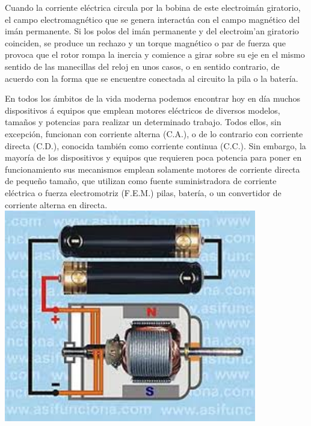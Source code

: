 \documentclass[12pt,a4paper]{article}
\begin{document}
Cuando la corriente el\'ectrica circula por la bobina de este electroim\'an giratorio, el campo electromagn\'etico que se genera interact\'ua con el campo magn\'etico del im\'an permanente. Si los polos del im\'an permanente y del electroim'an giratorio coinciden, se produce un rechazo y un torque magn\'etico o par de fuerza que provoca que el rotor rompa la inercia y comience a girar sobre su eje en el mismo sentido de las manecillas del reloj en unos casos, o en sentido contrario, de acuerdo con la forma que se encuentre conectada al circuito la pila o la bater\'ia.

\newpage
En todos los \'ambitos de la vida moderna podemos encontrar hoy en d\'ia muchos dispositivos \'a equipos que emplean motores el\'ectricos de diversos modelos, tama\~nos y potencias para realizar un determinado trabajo. Todos ellos, sin excepci\'on, funcionan con corriente alterna (C.A.), o de lo contrario con corriente directa (C.D.), conocida tambi\'en como corriente continua (C.C.). Sin embargo, la mayor\'ia de los dispositivos y equipos que requieren poca potencia para poner en funcionamiento sus mecanismos emplean solamente motores de corriente directa de peque\~no tama\~no, que utilizan como fuente suministradora de corriente el\'ectrica o fuerza electromotriz (F.E.M.) pilas, bater\'ia, o un convertidor de corriente alterna en directa.\\\includegraphics[width=11cm]{descarga.jpeg} \\
\end{document}
